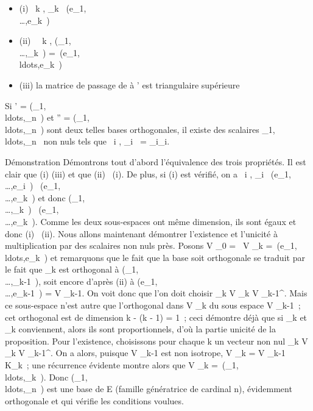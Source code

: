 \documentclass[]{article}
\begin{document}
\begin{itemize}
\itemsep1pt\parskip0pt
\item
  (i) \forall~k \in [1,n], \epsilon_k~
  \in\mathrmVect(e_1,\\\ldots,e_k~)
\item
  (ii) \forall~~k \in [1,n],
  \mathrmVect(\epsilon_1,\\\ldots,\epsilon_k~)
  =\
  \mathrmVect(e_1,\\ldots,e_k~)
\item
  (iii) la matrice de passage de  à ' est triangulaire supérieure
\end{itemize}

Si ' =
(\epsilon_1,\\ldots,\epsilon_n~)
et \mathcal{E}'' =
(\eta_1,\\ldots,\eta_n~)
sont deux telles bases orthogonales, il existe des scalaires
\lambda_1,\\ldots,\lambda_n~
non nuls tels que \forall~i \in [1,n], \eta_i~
= \lambda_i\epsilon_i.

Démonstration Démontrons tout d'abord l'équivalence des trois
propriétés. Il est clair que (i) \Leftrightarrow (iii) et
que (ii) \rigtharrow~(i). De plus, si (i) est vérifié, on a
\forall~i \in [1,k], \epsilon_i~
\in\mathrmVect(e_1,\\\ldots,e_i~)
\subset~\mathrmVect(e_1,\\\ldots,e_k~)
et donc
\mathrmVect(\epsilon_1,\\\ldots,\epsilon_k~)
\subset~\mathrmVect(e_1,\\\ldots,e_k~).
Comme les deux sous-espaces ont même dimension, ils sont égaux et donc
(i) \rigtharrow~(ii). Nous allons maintenant démontrer l'existence et l'unicité à
multiplication par des scalaires non nuls près. Posons V _0 =
\0\, V _k
=\
\mathrmVect(e_1,\\ldots,e_k~)
et remarquons que le fait que la base soit orthogonale se traduit par le
fait que \epsilon_k est orthogonal à
\mathrmVect(\epsilon_1,\\\ldots,\epsilon_k-1~),
soit encore d'après (ii) à
\mathrmVect(e_1,\\\ldots,e_k-1~)
= V _k-1. On voit donc que l'on doit choisir \epsilon_k \in V
_k \bigcap V _k-1^\bot. Mais ce sous-espace n'est autre
que l'orthogonal dans V _k du sous espace V _k-1~; cet
orthogonal est de dimension k - (k - 1) = 1~; ceci démontre déjà que si
\epsilon_k et \eta_k conviennent, alors ils sont proportionnels,
d'où la partie unicité de la proposition. Pour l'existence, choisissons
pour chaque k un vecteur non nul \epsilon_k \in V _k \bigcap V
_k-1^\bot. On a alors, puisque V _k-1 est non
isotrope, V _k = V _k-1 \oplus~ K\epsilon_k~; une
récurrence évidente montre alors que V _k
=\
\mathrmVect(\epsilon_1,\\ldots,\epsilon_k~).
Donc
(\epsilon_1,\\ldots,\epsilon_n~)
est une base de E (famille génératrice de cardinal n), évidemment
orthogonale et qui vérifie les conditions voulues.
\end{document}
